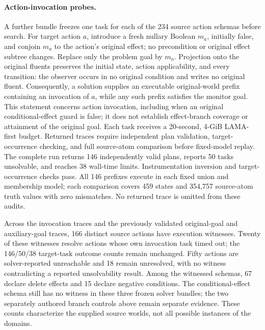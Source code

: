 \documentclass[letterpaper]{article}
\begin{document}
\paragraph{Action-invocation probes.}
A further bundle freezes one task for each of the 234 source action schemas before search. For target action $a$, introduce a fresh nullary Boolean $m_a$, initially false, and conjoin $m_a$ to the action's original effect; no precondition or original effect subtree changes. Replace only the problem goal by $m_a$. Projection onto the original fluents preserves the initial state, action applicability, and every transition: the observer occurs in no original condition and writes no original fluent. Consequently, a solution supplies an executable original-world prefix containing an invocation of $a$, while any such prefix satisfies the monitor goal. This statement concerns action invocation, including when an original conditional-effect guard is false; it does not establish effect-branch coverage or attainment of the original goal. Each task receives a 20-second, 4-GiB LAMA-first budget. Returned traces require independent plan validation, target-occurrence checking, and full source-atom comparison before fixed-model replay. The complete run returns 146 independently valid plans, reports 50 tasks unsolvable, and reaches 38 wall-time limits. Instrumentation inversion and target-occurrence checks pass. All 146 prefixes execute in each fixed union and membership model; each comparison covers 459 states and 354,757 source-atom truth values with zero mismatches. No returned trace is omitted from these audits.

Across the invocation traces and the previously validated original-goal and auxiliary-goal traces, 166 distinct source actions have execution witnesses. Twenty of these witnesses resolve actions whose own invocation task timed out; the 146/50/38 target-task outcome counts remain unchanged. Fifty actions are solver-reported unreachable and 18 remain unresolved, with no witness contradicting a reported unsolvability result. Among the witnessed schemas, 67 declare delete effects and 15 declare negative conditions. The conditional-effect schema still has no witness in these three frozen solver bundles; the two separately authored branch controls above remain separate evidence. These counts characterize the supplied source worlds, not all possible instances of the domains.
\end{document}
